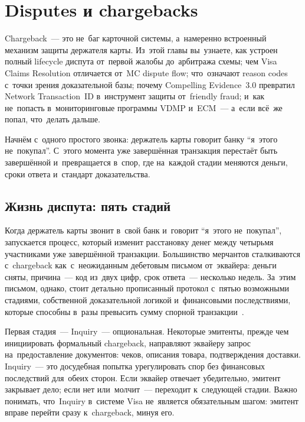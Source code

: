 \chapter{Disputes и chargebacks}
\label{ch:disputes}

\begin{kaobox}[title=Что вы узнаете из этой главы]
  Chargeback~--- это не~баг карточной системы, а~намеренно встроенный
  механизм защиты держателя карты. Из~этой главы вы~узнаете, как устроен
  полный lifecycle диспута от~первой жалобы до~арбитража схемы; чем Visa
  Claims Resolution отличается от~MC dispute flow; что~означают reason codes
  с~точки зрения доказательной базы; почему Compelling Evidence~3.0 превратил
  Network Transaction~ID в~инструмент защиты от~friendly fraud; и~как не~попасть
  в~мониторинговые программы VDMP и~ECM~--- а~если всё~же попал, что~делать
  дальше.
\end{kaobox}

Начнём с~одного простого звонка: держатель карты говорит банку
\enquote{я~этого не~покупал}. С~этого момента уже завершённая
транзакция перестаёт быть завершённой и~превращается в~спор,
где на~каждой стадии меняются деньги, сроки ответа и~стандарт
доказательства.


\section{Жизнь диспута: пять стадий}
\label{sec:disputes-lifecycle}

Когда держатель карты звонит в~свой банк и~говорит \enquote{я~этого
  не~покупал}, запускается процесс, который изменит расстановку денег между
четырьмя участниками уже завершённой транзакции. Большинство мерчантов
сталкиваются с~chargeback как~с~неожиданным дебетовым письмом от~эквайера:
деньги сняты, причина~--- код из~двух цифр, срок ответа~--- несколько
недель. За~этим письмом, однако, стоит детально прописанный протокол
с~пятью возможными стадиями, собственной доказательной логикой и~финансовыми
последствиями, которые способны в~разы превысить сумму спорной
транзакции~.

Первая стадия~--- Inquiry~--- опциональная. Некоторые эмитенты,
прежде чем инициировать формальный chargeback, направляют эквайеру
запрос на~предоставление документов: чеков, описания товара, подтверждения
доставки. Inquiry~--- это досудебная попытка урегулировать спор без
финансовых последствий для~обеих сторон. Если эквайер отвечает убедительно,
эмитент закрывает дело; если нет или~молчит~--- переходит к~следующей
стадии. Важно понимать, что~Inquiry в~системе Visa не~является
обязательным шагом: эмитент вправе перейти сразу к~chargeback, минуя его.

